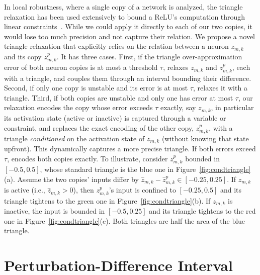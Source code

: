 In local robustness, where a single copy of a network is analyzed, the triangle
relaxation has been used extensively to bound a
ReLU's computation through linear constraints~\cite{ehlers2017,singh2019,tjandraatmadja2020convex}.
While we could apply it directly to each of our two copies, it
would lose too much precision and not capture their relation. We propose a novel triangle relaxation that explicitly relies on the relation between a neuron $z_{m,k}$
and its copy $z^{p}_{m,k}$. It has three cases. First, if the triangle over-approximation error of both neuron copies is at most a threshold $\tau$, \tool
relaxes $z_{m,k}$ and $z^{p}_{m,k}$, each with a triangle, and couples them through an interval
bounding their difference. Second, if only
one copy is unstable and its error is at most $\tau$, \tool relaxes it with a triangle. Third, if both copies are unstable and only one has error at most $\tau$, our relaxation encodes
the copy whose error exceeds $\tau$ exactly, say $z_{m,k}$, in particular its activation state (active or inactive) is captured through
a variable or constraint, and replaces the exact encoding of the other copy, $z^p_{m,k}$, with a triangle
\emph{conditioned} on the activation state of $z_{m,k}$ (without knowing that state upfront). This
dynamically captures a more precise triangle.
If both errors exceed $\tau$, \tool encodes both copies exactly.
To illustrate, consider $z^p_{m,k}$ bounded in $[-0.5, 0.5]$, whose standard triangle is the blue one
in Figure~\ref{fig:condtriangle}(a). Assume the two copies' inputs differ by $\hat{z}_{m,k} - \hat{z}^p_{m,k} \in [-0.25, 0.25]$. If
$z_{m,k}$ is active (i.e., $\hat{z}_{m,k} > 0$), then $z^p_{m,k}$'s input is confined to $[-0.25, 0.5]$
and its triangle tightens to the green one in Figure~\ref{fig:condtriangle}(b). If
$z_{m,k}$ is inactive, the input is bounded in $[-0.5, 0.25]$ and its triangle tightens to the red one
in Figure~\ref{fig:condtriangle}(c). Both triangles are half the area of the blue triangle.

\section{Perturbation-Difference Interval}
\label{sec:key-ideas-pert-diff}

